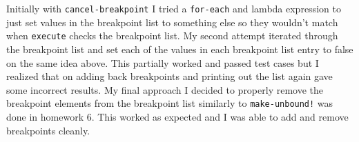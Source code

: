 \documentclass[a4paper,12pt]{article}
\begin{document}
Initially with \texttt{cancel-breakpoint} I tried a \texttt{for-each} and lambda expression to just set values in the breakpoint list to something else so they wouldn't match when \texttt{execute} checks the breakpoint list. My second attempt iterated through the breakpoint list and set each of the values in each breakpoint list entry to false on the same idea above. This partially worked and passed test cases but I realized that on adding back breakpoints and printing out the list again gave some incorrect results. My final approach I decided to properly remove the breakpoint elements from the breakpoint list similarly to \texttt{make-unbound!} was done in homework 6. This worked as expected and I was able to add and remove breakpoints cleanly.


%

%
\end{document}
